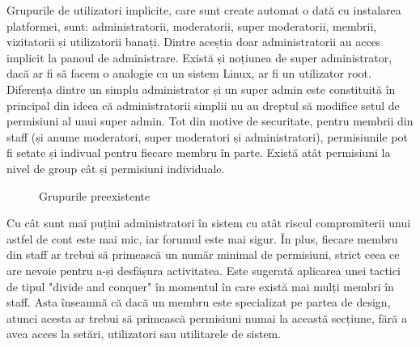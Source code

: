 Grupurile de utilizatori implicite, care sunt create automat o dată cu instalarea platformei, sunt: administratorii, moderatorii, super moderatorii, membrii, vizitatorii și utilizatorii banați. Dintre aceștia doar administratorii au acces implicit la panoul de administrare. Există și noțiunea de super administrator, dacă ar fi să facem o analogie cu un sistem Linux, ar fi un utilizator root. Diferența dintre un simplu administrator și un super admin este constituită în principal din ideea că administratorii simplii nu au dreptul să modifice setul de permisiuni al unui super admin. Tot din motive de securitate, pentru membrii din staff (și anume moderatori, super moderatori și administratori), permisiunile pot fi setate și indivual pentru fiecare membru în parte. Există atât permisiuni la nivel de group cât și permisiuni individuale.

\begin{figure}
    \vspace{-10pt}
    \vspace{-20pt}
    \caption{\label{fig:Policy-Groups} Grupurile preexistente}
    \vspace{-10pt}
\end{figure}

Cu cât sunt mai puțini administratori în sistem cu atât riscul compromiterii unui astfel de cont este mai mic, iar forumul este mai sigur. În plus, fiecare membru din staff ar trebui să primească un număr minimal de permisiuni, strict ceea ce are nevoie pentru a-și desfășura activitatea. Este sugerată aplicarea unei tactici de tipul "divide and conquer" în momentul în care există mai mulți membri în staff. Asta înseamnă că dacă un membru este specializat pe partea de design, atunci acesta ar trebui să primească permisiuni numai la această secțiune, fără a avea acces la setări, utilizatori sau utilitarele de sistem.

